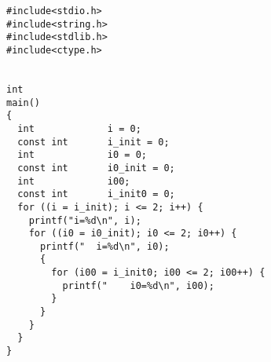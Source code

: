  \begin{verbatim}
#include<stdio.h>
#include<string.h>
#include<stdlib.h>
#include<ctype.h>


int 
main()
{
  int             i = 0;
  const int       i_init = 0;
  int             i0 = 0;
  const int       i0_init = 0;
  int             i00;
  const int       i_init0 = 0;
  for ((i = i_init); i <= 2; i++) {
    printf("i=%d\n", i);
    for ((i0 = i0_init); i0 <= 2; i0++) {
      printf("  i=%d\n", i0);
      {
        for (i00 = i_init0; i00 <= 2; i00++) {
          printf("    i0=%d\n", i00);
        }
      }
    }
  }
}
\end{verbatim} 
